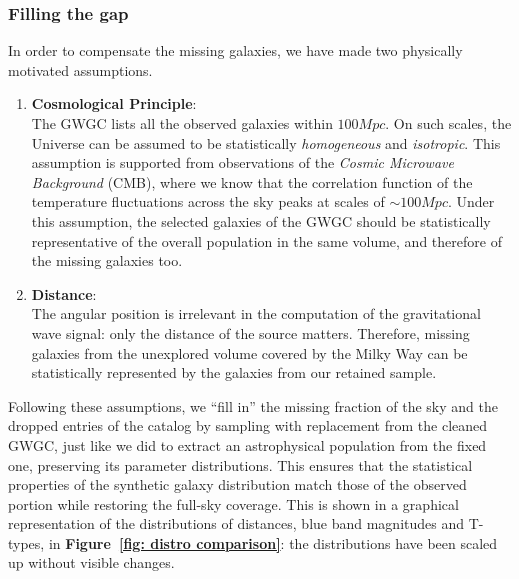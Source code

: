 \subsubsection{Filling the gap}
In order to compensate the missing galaxies, we have made two physically motivated assumptions.
\begin{enumerate}
    \item \textbf{Cosmological Principle}:\\
    The GWGC lists all the observed galaxies within $100Mpc$.
    On such scales, the Universe can be assumed to be statistically \textit{homogeneous} and \textit{isotropic}. 
    This assumption is supported from observations of the \textit{Cosmic Microwave Background} (CMB), where we know that the correlation function of the temperature fluctuations across the sky peaks at scales of $\sim100Mpc$. 
    Under this assumption, the selected galaxies of the GWGC should be statistically representative of the overall population in the same volume, and therefore of the missing galaxies too.
    \item \textbf{Distance}:\\ 
    The angular position is irrelevant in the computation of the gravitational wave signal: only the distance of the source matters.
    Therefore, missing galaxies from the unexplored volume covered by the Milky Way can be statistically represented by the galaxies from our retained sample.
\end{enumerate}
Following these assumptions, we “fill in” the missing fraction of the sky and the dropped entries of the catalog by sampling with replacement from the cleaned GWGC, just like we did to extract an astrophysical population from the fixed one, preserving its parameter distributions.
This ensures that the statistical properties of the synthetic galaxy distribution match those of the observed portion while restoring the full-sky coverage. 
This is shown in a graphical representation of the distributions of distances, blue band magnitudes and T-types, in \textbf{Figure~\ref{fig: distro comparison}}: the distributions have been scaled up without visible changes.
